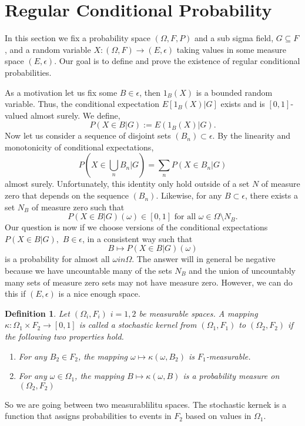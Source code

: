 \documentclass{article}
\newtheorem{definition}{Definition}
\begin{document}
\section{Regular Conditional Probability}
In this section we fix a probability space $(\Omega, F, P)$ and a sub sigma field, $G\subseteq F$, and a random variable $X\colon (\Omega, F)\to (E, \epsilon)$ taking values in some measure space $(E,\epsilon)$. Our goal is to define and prove the existence of regular conditional probabilities.
\par As a motivation let us fix some $B\in \epsilon$, then $1_B(X)$ is a bounded random variable. Thus, the conditional expectation $E[1_B(X)|G]$ exists and is $[0,1]$-valued almost surely. We define, 
$$P(X\in B|G):=E(1_B(X)|G).$$
Now let us consider a sequence of disjoint sets $(B_n)\subset \epsilon$. By the linearity and monotonicity of conditional expectations, 
$$P\left(X\in \bigcup_n B_n|G\right)=\sum_n P(X\in B_n|G)$$
almost surely. Unfortunately, this identity only hold outside of a set $N$ of measure zero that depends on the sequence $(B_n)$. 
Likewise, for any $B\subset \epsilon$, there exists a set $N_B$ of measure zero such that 
$$P(X\in B| G)(\omega)\in [0,1]\text{ for all }\omega \in \Omega \setminus N_B.$$
Our question is now if we choose versions of the conditional expectations $P(X\in B|G),$ $B\in \epsilon$, in a consistent way such that 
$$B\mapsto P(X\in B|G)(\omega)$$
is a probability for almost all $\omega in \Omega$. The answer will in general be negative because we have uncountable many of the sets $N_B$ and the union of uncountably many sets of measure zero sets may not have measure zero. However, we can do this if $(E,\epsilon)$ is a nice enough space.
\begin{definition}
    Let $(\Omega_i, F_i)$ $i=1,2$ be measurable spaces. A mapping $\kappa: \Omega_1 \times F_2 \to [0,1]$ is called a stochastic kernel from $(\Omega_1, F_1)$ to $(\Omega_2, F_2)$ if the following two properties hold.
    \begin{enumerate}
        \item For any $B_2\in F_2$, the mapping $\omega \mapsto \kappa(\omega, B_2)$ is $F_1$-measurable.
        \item For any $\omega \in \Omega_1$, the mapping $B\mapsto \kappa(\omega, B)$ is a probability measure on $(\Omega_2, F_2)$
    \end{enumerate}
\end{definition}
So we are going between two measurablilitu spaces. The stochastic kernek is a function that assigns probabilities to events in $F_2$ based on values in $\Omega_1$.
\end{document}
